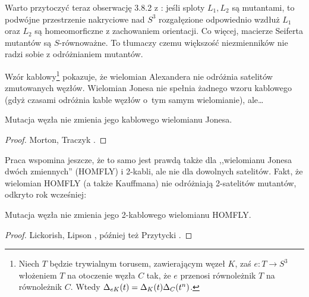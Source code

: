 Warto przytoczyć teraz obserwację 3.8.2 z \cite[s. 43]{kawauchi96}: jeśli sploty $L_1, L_2$ są mutantami, to podwójne przestrzenie nakryciowe nad $S^3$ rozgałęzione odpowiednio wzdłuż $L_1$ oraz $L_2$ są homeomorficzne z zachowaniem orientacji.
Co więcej, macierze Seiferta mutantów są $S$-równoważne.
%
To tłumaczy czemu większość niezmienników nie radzi sobie z odróżnianiem mutantów.

Wzór kablowy\footnote{Niech $T$ będzie trywialnym torusem, zawierającym węzeł $K$, zaś $e \colon T \to S^3$ włożeniem $T$ na otoczenie węzła $C$ tak, że $e$ przenosi równoleżnik $T$ na równoleżnik $C$. Wtedy $\Delta_{eK} (t) = \Delta_K(t)\Delta_C(t^n)$.} \cite[tw. 6.15]{lickorish97} pokazuje, że wielomian Alexandera nie odróżnia satelitów zmutowanych węzłów.
Wielomian Jonesa nie spełnia żadnego wzoru kablowego (gdyż czasami odróżnia kable węzłów o~tym samym wielomianie), ale…
%

\begin{proposition}
    Mutacja węzła nie zmienia jego kablowego wielomianu Jonesa.
%
\end{proposition}

\begin{proof}
%
%
    Morton, Traczyk \cite{traczyk88}.
\end{proof}

Praca \cite{traczyk88} wspomina jeszcze, że to samo jest prawdą także dla ,,wielomianu Jonesa dwóch zmiennych'' (HOMFLY) i 2-kabli, ale nie dla dowolnych satelitów.
Fakt, że wielomian HOMFLY (a także Kauffmana) nie odróżniają 2-satelitów mutantów, odkryto rok wcześniej:

\begin{proposition}
\label{mutants_and_homfly}%
%
    Mutacja węzła nie zmienia jego 2-kablowego wielomianu HOMFLY.
\end{proposition}

\begin{proof}
%
%
%
    Lickorish, Lipson \cite{lipson87}, później też Przytycki \cite{przytycki89}.
\end{proof}

